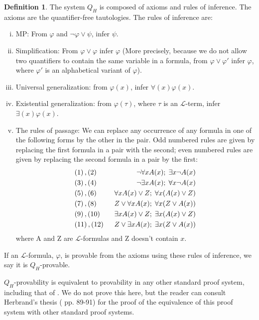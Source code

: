 \documentclass[a4paper,12pt]{report}
\theoremstyle{definition}
\newtheorem{mydef}[lem]{Definition}
\begin{document}
\begin{mydef}
The system $Q_H$ is composed of axioms and rules of inference. The axioms are the quantifier-free tautologies. The rules of inference are:
\begin{enumerate}[(i)]
\item MP: From $\varphi$ and $\neg \varphi \lor \psi$, infer $\psi$.
\item Simplification: From $\varphi \lor \varphi$ infer $\varphi$ (More precisely, because we do not allow two quantifiers to contain the same variable in a formula, from $\varphi \lor \varphi'$ infer $\varphi$, where $\varphi'$ is an alphabetical variant of $\varphi$).
\item Universal generalization: from $\varphi(x)$, infer $\forall(x) \varphi(x)$.
\item Existential generalization: from $\varphi(\tau)$, where $\tau$ is an $\mathcal{L}$-term, infer $\exists(x)\varphi(x)$.
\item The rules of passage:
\label{rulesofpassage}
\noindent We can replace any occurrence of any formula in one of the following forms by the other in the pair. Odd numbered rules are given by replacing the first formula in a pair with the second; even numbered rules are given by replacing the second formula in a pair by the first:
\begin{align}
&(1) \, , (2) \; \; &\neg \forall x A(x) ; \; \exists x \neg A(x) \notag \\
&(3) \, , (4) \; \; &\neg \exists x A(x) ; \; \forall x \neg A(x) \notag \\
&(5) \, , (6) \; \; &\forall x A(x) \lor Z ; \; \forall x (A(x) \lor Z) \notag \\
&(7) \, , (8) \; \; &Z \lor \forall x A(x) ; \; \forall x (Z \lor A(x)) \notag \\
&(9) \, , (10) \; \; &\exists x A(x) \lor Z ; \; \exists x (A(x) \lor Z) \notag \\
&(11) \, , (12) \; \; &Z \lor \exists x A(x) ; \; \exists x (Z \lor A(x)) \notag
\end{align}
\noindent where A and Z are $\mathcal{L}$-formulas and Z doesn't contain $x$.
\end{enumerate}
If an $\mathcal{L}$-formula, $\varphi$, is provable from the axioms using these rules of inference, we say it is $Q_H$-provable.
\end{mydef}

$Q_H$-provability is equivalent to provability in any other standard proof system, including that of \cite{logic10}. We do not prove this here, but the reader can consult Herbrand's thesis (\cite{jhdiss} pp. 89-91) for the proof of the equivalence of this proof system with other standard proof systems.
\end{document}
